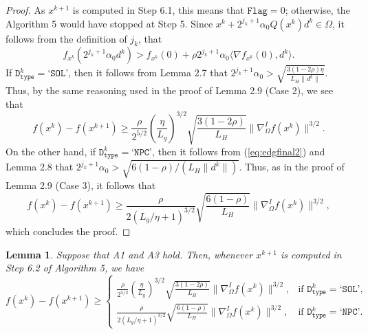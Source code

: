 \documentclass[11pt]{article}
\newtheorem{lemma}[theorem]{Lemma}
\begin{document}
\begin{proof}
As $x^{k+1}$ is computed in Step 6.1, this means that $\texttt{Flag}=0$; otherwise, the Algorithm 5 would have stopped at Step 5. Since $x^{k}+2^{j_{k}+1}\alpha_{0}Q(x^{k})d^{k}\in\Omega$, it follows from the definition of $j_{k}$, that 
\begin{equation}
f_{x^{k}}(2^{j_{k}+1}\alpha_{0}d^{k})>f_{x^{k}}(0)+\rho 2^{j_{k}+1}\alpha_{0}\langle\nabla f_{x^{k}}(0),d^{k}\rangle.
\label{eq:edgfinal2}
\end{equation}
If $\texttt{D}_{\texttt{type}}^{k}=\texttt{`SOL'}$, then it follows from Lemma 2.7 that $2^{j_{k}+1}\alpha_{0}>\sqrt{\frac{3(1-2\rho)\eta}{L_{H}\|d^{k}\|}}$. Thus, by the same reasoning used in the proof of Lemma 2.9 (Case 2), we see that
\[
f(x^{k})-f(x^{k+1})\geq\frac{\rho}{2^{5/2}}\left(\frac{\eta}{L_{g}}\right)^{3/2}\sqrt{\frac{3(1-2\rho)}{L_{H}}}\|\nabla_{\Omega}^{I}f(x^{k})\|^{3/2}.
\]
On the other hand, if $\texttt{D}_{\texttt{type}}^{k}=\texttt{`NPC'}$, then it follows from (\ref{eq:edgfinal2}) and Lemma 2.8 that $2^{j_{k}+1}\alpha_{0}>\sqrt{6(1-\rho)/(L_{H}\|d^{k}\|)}$. Thus, as in the proof of Lemma 2.9 (Case 3), it follows that 
\[
f(x^{k})-f(x^{k+1}) \geq \frac{\rho}{2(L_{g}/\eta+1)^{3/2}}\sqrt{\frac{6(1-\rho)}{L_{H}}}\|\nabla_{\Omega}^{I}f(x^{k})\|^{3/2},
\]
which concludes the proof.
\end{proof}

\begin{lemma}
Suppose that A1 and A3 hold. Then, whenever $x^{k+1}$ is computed in Step 6.2 of Algorithm 5, we have
\begin{equation}
f(x^{k}) - f(x^{k+1}) \geq 
\left\{
\begin{array}{ll}
\frac{\rho}{2^{5/2}}\left(\frac{\eta}{L_{g}}\right)^{3/2}\sqrt{\frac{3(1-2\rho)}{L_{H}}}\|\nabla_{\Omega}^{I}f(x^{k})\|^{3/2}, 
& \text{if } \texttt{D}_{\texttt{type}}^{k}=\texttt{`SOL'},\\
\frac{\rho}{2(L_g/\eta+1)^{3/2}}\sqrt{\frac{6(1-\rho)}{L_{H}}}\|\nabla_{\Omega}^{I}f(x^{k})\|^{3/2}, 
& \text{if } \texttt{D}_{\texttt{type}}^{k}=\texttt{`NPC'}.
\end{array}
\right.
\label{eq:edgfinal3}
\end{equation}
\end{lemma}
\end{document}
